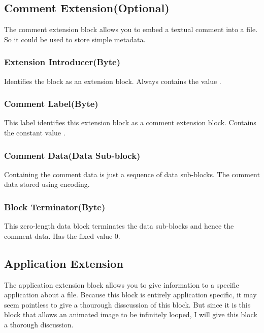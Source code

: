 \subsection{Comment Extension(Optional)}

The comment extension block allows you to embed a textual comment into
a \gif file. So it could be used to store simple metadata.

\subsubsection{Extension Introducer(Byte)}

Identifies the block as an extension block. Always contains the
value .

\subsubsection{Comment Label(Byte)}

This label identifies this extension block as a comment extension
block. Contains the constant value .

\subsubsection{Comment Data(Data Sub-block)}

Containing the comment data is just a sequence of data sub-blocks. The
comment data stored using \ascii encoding.

\subsubsection{Block Terminator(Byte)}

This zero-length data block terminates the data sub-blocks and hence
the comment data. Has the fixed value $0$.

\subsection{Application Extension}

The application extension block allows you to give information to a
specific application about a \gif file. Because this block is
entirely application specific, it may seem pointless to give a
thourough disscussion of this block. But since it is this block that
allows an animated \gif image to be infinitely looped, I will give this
block a thorough discussion.

